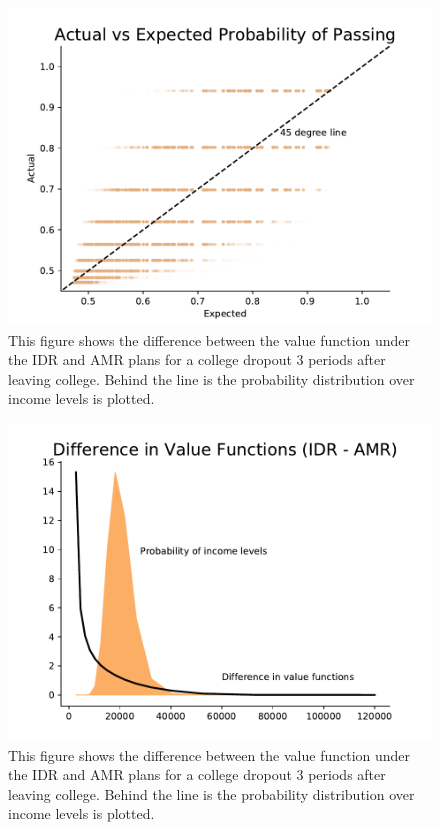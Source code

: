   \begin{center}
    \begin{figure}[H]
      \includegraphics[width=\textwidth]{images/StudentLoans/ep_vs_p.pdf}
      \caption{
        {\small This figure shows the difference between the value function under the IDR and AMR plans for
        a college dropout 3 periods after leaving college. Behind the line is the probability
        distribution over income levels is plotted.}
      }
      \label{fig:scatter_ep_vs_p}
    \end{figure}
  \end{center}

  \begin{center}
    \begin{figure}[H]
      \includegraphics[width=\textwidth]{images/StudentLoans/vf_vs_income_probs.pdf}
      \caption{
        {\small This figure shows the difference between the value function under the IDR and AMR plans for
        a college dropout 3 periods after leaving college. Behind the line is the probability
        distribution over income levels is plotted.}
      }
      \label{fig:vfs_enrollment}
    \end{figure}
  \end{center}

